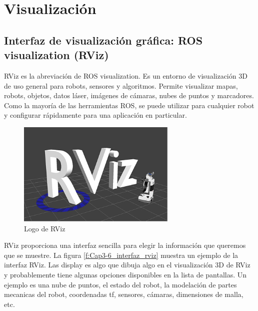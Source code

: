     
        \newpage    



\section{Visualización}
    
    \subsection{Interfaz de visualización gráfica: ROS visualization (RViz)}

        RViz es la abreviación de ROS visualization. Es un entorno de visualización 3D de uso general para robots, sensores y algoritmos. Permite visualizar mapas, robots, objetos, datos láser, imágenes de cámaras, nubes de puntos y marcadores.   Como la mayoría de las herramientas ROS, se puede utilizar para cualquier robot y configurar rápidamente para una aplicación en particular. 
        
        \begin{figure}[htb]
            \centering
            \includegraphics[width=0.35\linewidth]{Main/Chapter3/Images3/3-6/logo-rviz.png}
            \caption{Logo de RViz}
            \label{f:Cap3-6_logo_rviz}
        \end{figure}
        
        RViz proporciona una interfaz sencilla para elegir la información que queremos que se muestre. La figura \eqref{f:Cap3-6_interfaz_rviz} muestra un ejemplo de la interfaz RViz. Las display es algo que dibuja algo en el visualización 3D de RViz y probablemente tiene algunas opciones disponibles en la lista de pantallas. Un ejemplo es una nube de puntos, el estado del robot, la modelación de partes mecanicas del robot, coordenadas tf, sensores, cámaras, dimensiones de malla, etc.
        

